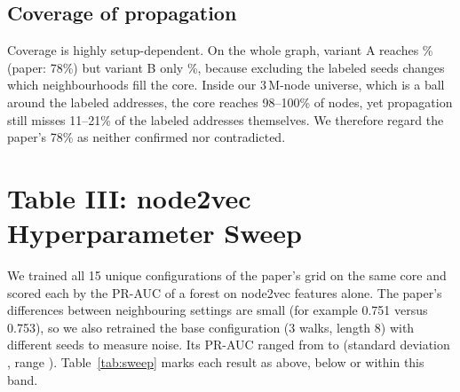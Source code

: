 \subsection{Coverage of propagation}
\begin{table}[H]
\centering\footnotesize\singlespacing

\caption{Share of addresses that propagation can embed (core members plus addresses with at least one core neighbour).}
\label{tab:cov}
\end{table}
Coverage is highly setup-dependent. On the whole graph, variant A reaches \CovA\% (paper: 78\%) but variant B only \CovB\%, because excluding the labeled seeds changes which neighbourhoods fill the core. Inside our 3\,M-node universe, which is a ball around the labeled addresses, the core reaches 98--100\% of nodes, yet propagation still misses 11--21\% of the labeled addresses themselves. We therefore regard the paper's 78\% as neither confirmed nor contradicted.

\section{Table III: node2vec Hyperparameter Sweep}
We trained all 15 unique configurations of the paper's grid on the same core and scored each by the PR-AUC of a forest on node2vec features alone. The paper's differences between neighbouring settings are small (for example 0.751 versus 0.753), so we also retrained the base configuration (3 walks, length 8) with \NoiseN{} different seeds to measure noise. Its PR-AUC ranged from \NoiseLo{} to \NoiseHi{} (standard deviation \NoiseStd{}, range \NoiseRange{}). Table~\ref{tab:sweep} marks each result as above, below or within this band.
\begin{table}[H]
\centering\scriptsize\singlespacing

\caption{Sweep results (PR-AUC = area under the precision--recall curve; the paper's column is its undefined ``AUC'', so compare orderings, not values). ``vs.\ noise'' compares with the \NoiseLo--\NoiseHi{} band of retraining noise. Train s = seconds to train.}
\label{tab:sweep}
\end{table}
